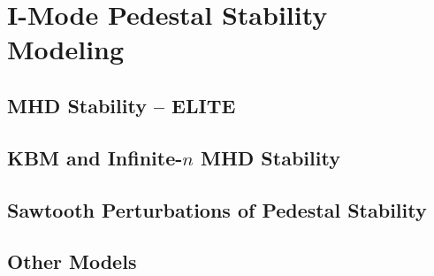 \chapter{I-Mode Pedestal Stability Modeling}\label{ch:ImodeModeling}

\section{MHD Stability -- ELITE}\label{sec:imode_elite}

\nicesectionending

\section{KBM and Infinite-$n$ MHD Stability}\label{sec:imode_baloo}

\nicesectionending

\section{Sawtooth Perturbations of Pedestal Stability}\label{sec:imode_sawtooth}


\nicesectionending

\section{Other Models}\label{sec:imode_nonMHD}

\nicechapterending


